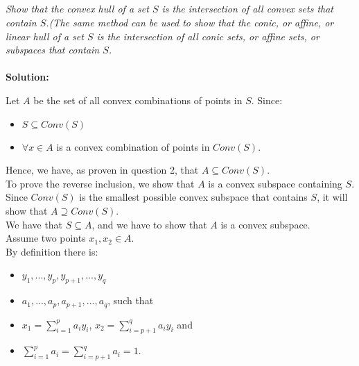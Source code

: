 \documentclass[10pt]{article}
\begin{document}
  	\newpage  	
  	
  	
  	\begin{center}
  	\section{}
  	\end{center}\par
  	\textit{Show that the convex hull of a set $S$ is the intersection of all convex sets that contain
$S$.(The same method can be used to show that the conic, or affine, or linear hull of a set $S$ is
the intersection of all conic sets, or affine sets, or subspaces that contain $S$.}\\ \\
  	\textbf{Solution:}\\ \par
  	Let $A$ be the set of all convex combinations of points in $S$. Since: \\
  	\begin{itemize}
  	\item $S \subseteq Conv(S)$ \\
  	 \item $\forall x \in A$  is a convex combination of points in $Conv(S)$. \\
  	 \end{itemize}
  	 Hence, we have, as proven in question 2, that $A \subseteq Conv(S)$. \\
  	 To prove the reverse inclusion, we show that $A$ is a convex subspace containing $S$. Since $Conv(S)$ is the smallest possible convex subspace that contains $S$, it will show that $A \supseteq Conv(S)$. \\
  	 We have that $S \subseteq A$, and we have to show that $A$ is a convex subspace. \\
  	 Assume two points $x_1, x_2 \in A$. \\
  	 By definition there is: \\
  	 	\begin{itemize}
  	\item $y_1, ..., y_p, y_{p+1}, ..., y_q$\\
  	 \item $a_1, ..., a_p, a_{p+1}, ..., a_q$, such that \\
  	 \item $x_1 = \sum_{i=1}^{p}{a_i}{y_i}$, \quad $x_2 = \sum_{i=p+1}^{q}{a_i}{y_i}$ \quad and \\
  	 \item $\sum_{i=1}^{p}{a_i} = \sum_{i=p+1}^{q}{a_i} =1. $
  	 \end{itemize} 
\end{document}
